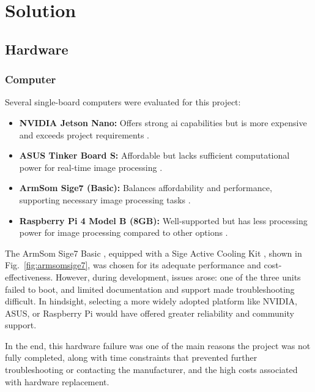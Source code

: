 \chapter{Solution}

\section{Hardware}

\subsection{Computer}\label{subsec:solution_computer}

Several single-board computers were evaluated for this project:

\begin{itemize}
	\item \textbf{NVIDIA Jetson Nano:} Offers strong \acrshort{ai} capabilities but is more expensive and exceeds project requirements \cite{nvidia_jetson_nano}.
	\item \textbf{ASUS Tinker Board S:} Affordable but lacks sufficient computational power for real-time image processing \cite{asus_tinkerboard_s}.
	\item \textbf{ArmSom Sige7 (Basic):} Balances affordability and performance, supporting necessary image processing tasks \cite{armsom_sige7}.
	\item \textbf{Raspberry Pi 4 Model B (8GB):} Well-supported but has less processing power for image processing compared to other options \cite{raspberry_pi_4b}.
\end{itemize}

The ArmSom Sige7 Basic \cite{armsom_sige7}, equipped with a Sige Active Cooling Kit \cite{armsom_sige_cooling_kit}, shown in Fig.~\ref{fig:armsomsige7}, was chosen for its adequate performance and cost-effectiveness. However, during development, issues arose: one of the three units failed to boot, and limited documentation and support made troubleshooting difficult. In hindsight, selecting a more widely adopted platform like NVIDIA, ASUS, or Raspberry Pi would have offered greater reliability and community support.

In the end, this hardware failure was one of the main reasons the project was not fully completed, along with time constraints that prevented further troubleshooting or contacting the manufacturer, and the high costs associated with hardware replacement.

